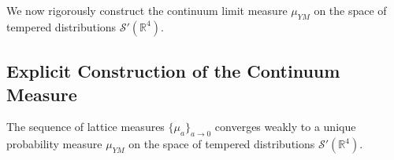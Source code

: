 We now rigorously construct the continuum limit measure $\mu_{YM}$ on the space of tempered distributions $\mathcal{S}'(\mathbb{R}^4)$.

\subsection{Explicit Construction of the Continuum Measure}
\label{sec:continuum-explicit}

\begin{theorem}
\label{thm:continuum-measure-construction}
The sequence of lattice measures $\{\mu_a\}_{a \to 0}$ converges weakly to a unique probability measure $\mu_{YM}$ on the space of tempered distributions $\mathcal{S}'(\mathbb{R}^4)$.
\end{theorem}

